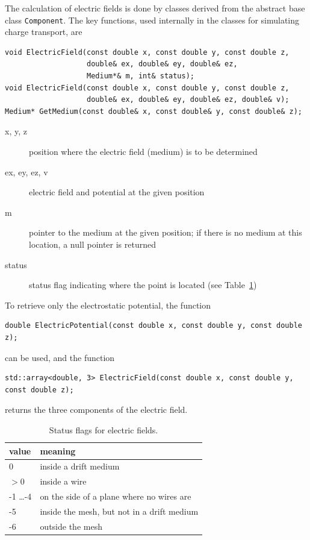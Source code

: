 The calculation of electric fields is done by classes 
derived from the abstract base class \texttt{Component}. 
The key functions, used internally in the classes for simulating charge transport, are 
\begin{lstlisting}
void ElectricField(const double x, const double y, const double z,
                   double& ex, double& ey, double& ez,
                   Medium*& m, int& status);
void ElectricField(const double x, const double y, const double z,
                   double& ex, double& ey, double& ez, double& v);
Medium* GetMedium(const double& x, const double& y, const double& z);
\end{lstlisting}
\begin{description}
  \item[x, y, z] 
  position where the electric field (medium) is to be determined
  \item[ex, ey, ez, v] 
  electric field and potential at the given position
  \item[m] pointer to the medium at the given position; 
  if there is no medium at this location, a null pointer is returned
  \item[status] status flag indicating where the point is located
  (see Table~\ref{Tab:StatusFlagsField})
\end{description}

To retrieve only the electrostatic potential, the function
\begin{lstlisting}
double ElectricPotential(const double x, const double y, const double z);
\end{lstlisting}
can be used, and the function
\begin{lstlisting}
std::array<double, 3> ElectricField(const double x, const double y, const double z);
\end{lstlisting}
returns the three components of the electric field.

\begin{table} 
  \centering
  \caption{Status flags for electric fields.}
  \label{Tab:StatusFlagsField}
  \begin{tabular}{l l}
  \toprule
  value & meaning \\
  \midrule
    0   & inside a drift medium \\
  \(> 0\) & inside a wire \\
   -1 \dots -4  &  on the side of a plane where no wires are \\
   -5   & inside the mesh, but not in a drift medium \\
   -6   & outside the mesh \\
  \bottomrule
  \end{tabular}
\end{table}

